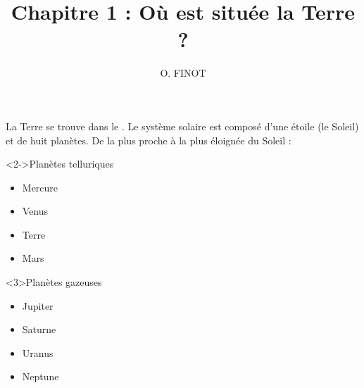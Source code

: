 \documentclass[xcolor={dvipsnames}]{beamer}
\title{Chapitre 1 : Où est située la Terre ?}
\author{O. FINOT}\institute{Collège S$^t$ Bernard}
\begin{document}
\begin{frame}
  \titlepage 
\end{frame}



\begin{frame}

La Terre se trouve dans le .
Le système solaire est composé d'une étoile (le Soleil) et de huit planètes. \pause De la plus proche à la plus éloignée du Soleil :



\begin{block}<2->{Planètes telluriques}
	\begin{center}
		\begin{itemize}
			\item Mercure
			\item Venus
			\item Terre
			\item Mars
		\end{itemize}
	\end{center}
\end{block}

\begin{block}<3>{Planètes gazeuses}
	\begin{center}
		\begin{itemize}
			\item Jupiter
			\item Saturne
			\item Uranus
			\item Neptune
		\end{itemize}
	\end{center}
\end{block}



\end{frame}
\end{document}
